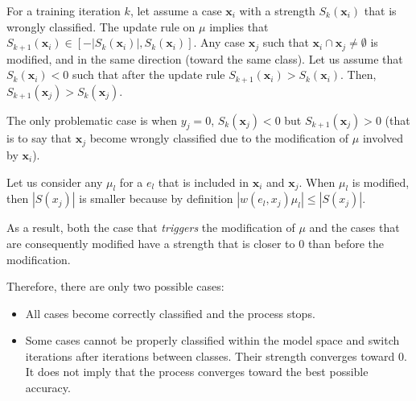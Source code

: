 For a training iteration $k$, let assume a case $\mathbf x_i$ with a strength $S_k(\mathbf x_i)$ that is wrongly classified. The update rule on $\mu$ implies that $S_{k+1}(\mathbf x_i) \in [-|S_k(\mathbf x_i)|, S_k(\mathbf x_i)]$. Any case $\mathbf x_j$ such that $\mathbf x_i \cap \mathbf x_j \neq \emptyset$ is modified, and in the same direction (toward the same class). Let us assume that $S_k(\mathbf x_i) < 0$ such that after the update rule $S_{k+1}(\mathbf x_i) > S_k(\mathbf x_i)$. Then, $S_{k+1}(\mathbf x_j) > S_{k}(\mathbf x_{j})$.

The only problematic case is when $y_j = 0$, $S_{k}(\mathbf x_j) < 0$ but $S_{k+1}(\mathbf x_j) > 0$ (that is to say that $\mathbf x_j$ become wrongly classified due to the modification of $\mu$ involved by $\mathbf x_i$).

Let us consider any $\mu_l$ for a $e_l$ that is included in $\mathbf x_i$ and $\mathbf x_j$. When $\mu_l$ is modified, then $|S(x_j)|$ is smaller because by definition $|w(e_l, x_j) \mu_l| \leq |S(x_j)|$.

As a result, both the case that {\it triggers} the modification of $\mu$ and the cases that are consequently modified have a strength that is closer to $0$ than before the modification.

Therefore, there are only two possible cases: \begin{itemize} \item All cases become correctly classified and the process stops. \item Some cases cannot be properly classified within the model space and switch iterations after iterations between classes. Their strength converges toward 0. It does not imply that the process converges toward the best possible accuracy. \end{itemize}

